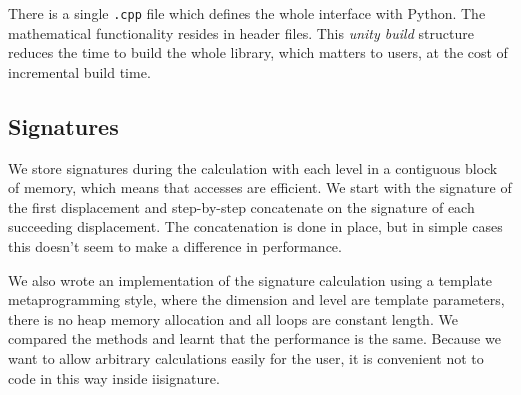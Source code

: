 There is a single \verb|.cpp| file which defines the whole interface with Python. The mathematical functionality resides in header files. This \emph{unity build} structure reduces the time to build the whole library, which matters to users, at the cost of incremental build time.

\subsection{Signatures}
We store signatures during the calculation with each level in a contiguous block of memory, which means that accesses are efficient. %
We start with the signature of the first displacement and step-by-step concatenate on the signature of each succeeding displacement. The concatenation is done in place, but in simple cases this doesn't seem to make a difference in performance.

We also wrote an implementation of the signature calculation using a template metaprogramming style, where the dimension and level are template parameters, there is no heap memory allocation and all loops are constant length. We compared the methods and learnt that the performance is the same. Because we want to allow arbitrary calculations easily for the user, it is convenient not to code in this way inside iisignature.

